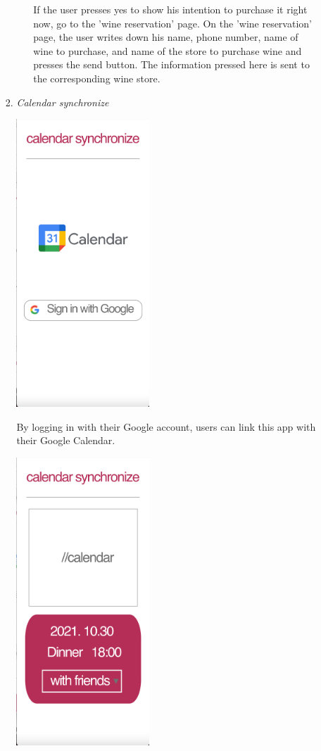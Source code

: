 \documentclass[conference]{IEEEtran}
\numberwithin{figure}{subsection}
\begin{document}
\begin{enumerate}
\begin{enumerate}
\begin{enumerate}
\begin{enumerate}
                If the user presses yes to show his intention to purchase it right now, go to the 'wine reservation' page. On the 'wine reservation' page, the user writes down his name, phone number, name of wine to purchase, and name of the store to purchase wine and presses the send button. The information pressed here is sent to the corresponding wine store. 
            \end{enumerate}
            \item \textit{Calendar synchronize}\\
            \centerline{\includegraphics[width=5cm]{calendar.png}}
            By logging in with their Google account, users can link this app with their Google Calendar. 
\centerline{\includegraphics[width=5cm]{calendar2.png}}

\end{enumerate}
\end{enumerate}
\end{enumerate}
\end{document}
